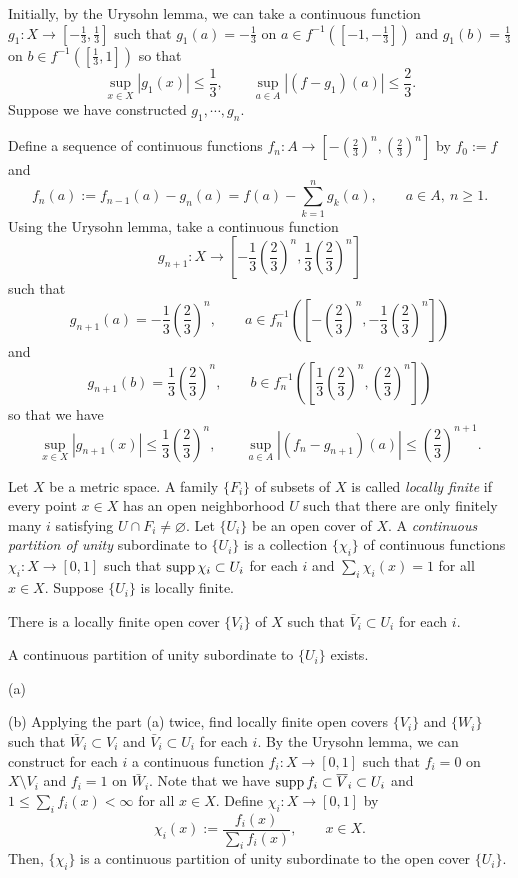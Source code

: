 \documentclass{../../large}
\begin{document}
\begin{pf}
Initially, by the Urysohn lemma, we can take a continuous function $g_1:X\to[-\frac13,\frac13]$ such that $g_1(a)=-\frac13$ on $a\in f^{-1}([-1,-\frac13])$ and $g_1(b)=\frac13$ on $b\in f^{-1}([\frac13,1])$ so that
\[\sup_{x\in X}|g_1(x)|\le\frac13,\qquad\sup_{a\in A}|(f-g_1)(a)|\le\frac23.\]
Suppose we have constructed $g_1,\cdots,g_n$.

Define a sequence of continuous functions $f_n:A\to\left[-\left(\frac23\right)^n,\left(\frac23\right)^n\right]$ by $f_0:=f$ and
\[f_n(a):=f_{n-1}(a)-g_n(a)=f(a)-\sum_{k=1}^ng_k(a),\qquad a\in A,\ n\ge1.\]
Using the Urysohn lemma, take a continuous function
\[g_{n+1}:X\to\left[-\frac13\left(\frac23\right)^n,\frac13\left(\frac23\right)^n\right]\]
such that
\[g_{n+1}(a)=-\frac13\left(\frac23\right)^n,\qquad a\in f_n^{-1}\left(\left[-\left(\frac23\right)^n,-\frac13\left(\frac23\right)^n\right]\right)\]
and
\[g_{n+1}(b)=\frac13\left(\frac23\right)^n,\qquad b\in f_n^{-1}\left(\left[\frac13\left(\frac23\right)^n,\left(\frac23\right)^n\right]\right)\]
so that we have
\[\sup_{x\in X}|g_{n+1}(x)|\le\frac13\left(\frac23\right)^n,\qquad\sup_{a\in A}|(f_n-g_{n+1})(a)|\le\left(\frac23\right)^{n+1}.\]

\end{pf}


\begin{prb}
Let $X$ be a metric space.
A family $\{F_i\}$ of subsets of $X$ is called \emph{locally finite} if every point $x\in X$ has an open neighborhood $U$ such that there are only finitely many $i$ satisfying $U\cap F_i\ne\varnothing.$
Let $\{U_i\}$ be an open cover of $X$.
A \emph{continuous partition of unity} subordinate to $\{U_i\}$ is a collection $\{\chi_i\}$ of continuous functions $\chi_i:X\to[0,1]$ such that $\operatorname{supp}\chi_i\subset U_i$ for each $i$ and $\sum_i\chi_i(x)=1$ for all $x\in X$.
Suppose $\{U_i\}$ is locally finite.
\begin{parts}
\item There is a locally finite open cover $\{V_i\}$ of $X$ such that $\bar V_i\subset U_i$ for each $i$.
\item A continuous partition of unity subordinate to $\{U_i\}$ exists.
\end{parts}
\end{prb}
\begin{pf}
(a)


(b)
Applying the part (a) twice, find locally finite open covers $\{V_i\}$ and $\{W_i\}$ such that $\bar W_i\subset V_i$ and $\bar V_i\subset U_i$ for each $i$.
By the Urysohn lemma, we can construct for each $i$ a continuous function $f_i:X\to[0,1]$ such that $f_i=0$ on $X\setminus V_i$ and $f_i=1$ on $\bar W_i$.
Note that we have $\operatorname{supp} f_i\subset\overline V_i\subset U_i$ and $1\le\sum_if_i(x)<\infty$ for all $x\in X$.
Define $\chi_i:X\to[0,1]$ by
\[\chi_i(x):=\frac{f_i(x)}{\sum_if_i(x)},\qquad x\in X.\]
Then, $\{\chi_i\}$ is a continuous partition of unity subordinate to the open cover $\{U_i\}$.
\end{pf}
\end{document}
